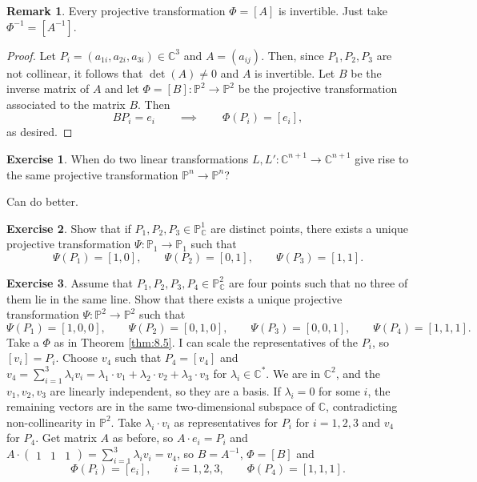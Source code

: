 \documentclass{article}
\newcommand{\C}{\mathbb{C}}
\renewcommand{\P}{\mathbb{P}}
\newcommand{\rb}[1]{\left( #1 \right)}
\renewcommand{\sb}[1]{\left[ #1 \right]}
\newcommand{\three}[3]{\begin{pmatrix} #1 & #2 & #3 \end{pmatrix}}
\theoremstyle{definition}\newtheorem{definition}{Definition}[section]
\theoremstyle{definition}\newtheorem{notation}[definition]{Notation}
\theoremstyle{definition}\newtheorem{remark}[definition]{Remark}
\theoremstyle{definition}\newtheorem{example}[definition]{Example}
\theoremstyle{definition}\newtheorem{fact}{Fact}
\theoremstyle{definition}\newtheorem{exercise}{Exercise}
\begin{document}
\begin{remark}
Every projective transformation $ \Phi = \sb{A} $ is invertible. Just take $ \Phi^{-1} = \sb{A^{-1}} $.
\end{remark}

\begin{proof}
Let $ P_i = \rb{a_{1i}, a_{2i}, a_{3i}} \in \C^3 $ and $ A = \rb{a_{ij}} $. Then, since $ P_1, P_2, P_3 $ are not collinear, it follows that $ \det\rb{A} \ne 0 $ and $ A $ is invertible. Let $ B $ be the inverse matrix of $ A $ and let $ \Phi = \sb{B} : \P^2 \to \P^2 $ be the projective transformation associated to the matrix $ B $. Then
$$ BP_i = e_i \qquad \implies \qquad \Phi\rb{P_i} = \sb{e_i}, $$
as desired.
\end{proof}

\begin{exercise}
When do two linear transformations $ L, L' : \C^{n + 1} \to \C^{n + 1} $ give rise to the same projective transformation $ \P^n \to \P^n $?
\end{exercise}

Can do better.

\begin{exercise}
Show that if $ P_1, P_2, P_3 \in \P^1_\C $ are distinct points, there exists a unique projective transformation $ \Psi : \P_1 \to \P_1 $ such that
$$ \Psi\rb{P_1} = \sb{1, 0}, \qquad \Psi\rb{P_2} = \sb{0, 1}, \qquad \Psi\rb{P_3} = \sb{1, 1}. $$
\end{exercise}

\begin{exercise}
Assume that $ P_1, P_2, P_3, P_4 \in \P^2_\C $ are four points such that no three of them lie in the same line. Show that there exists a unique projective transformation $ \Psi : \P^2 \to \P^2 $ such that
$$ \Psi\rb{P_1} = \sb{1, 0, 0}, \qquad \Psi\rb{P_2} = \sb{0, 1, 0}, \qquad \Psi\rb{P_3} = \sb{0, 0, 1}, \qquad \Psi\rb{P_4} = \sb{1, 1, 1}. $$
Take a $ \Phi $ as in Theorem \ref{thm:8.5}. I can scale the representatives of the $ P_i $, so $ \sb{v_i} = P_i $. Choose $ v_4 $ such that $ P_4 = \sb{v_4} $ and $ v_4 = \sum_{i = 1}^3 \lambda_i v_i = \lambda_1 \cdot v_1 + \lambda_2 \cdot v_2 + \lambda_3 \cdot v_3 $ for $ \lambda_i \in \C^* $. We are in $ \C^2 $, and the $ v_1, v_2, v_3 $ are linearly independent, so they are a basis. If $ \lambda_i = 0 $ for some $ i $, the remaining vectors are in the same two-dimensional subspace of $ \C $, contradicting non-collinearity in $ \P^2 $. Take $ \lambda_i \cdot v_i $ as representatives for $ P_i $ for $ i = 1, 2, 3 $ and $ v_4 $ for $ P_4 $. Get matrix $ A $ as before, so $ A \cdot e_i = P_i $ and $ A \cdot \three{1}{1}{1} = \sum_{i = 1}^3 \lambda_iv_i = v_4 $, so $ B = A^{-1} $, $ \Phi = \sb{B} $ and
$$ \Phi\rb{P_i} = \sb{e_i}, \qquad i = 1, 2, 3, \qquad \Phi\rb{P_4} = \sb{1, 1, 1}. $$
\end{exercise}
\end{document}
